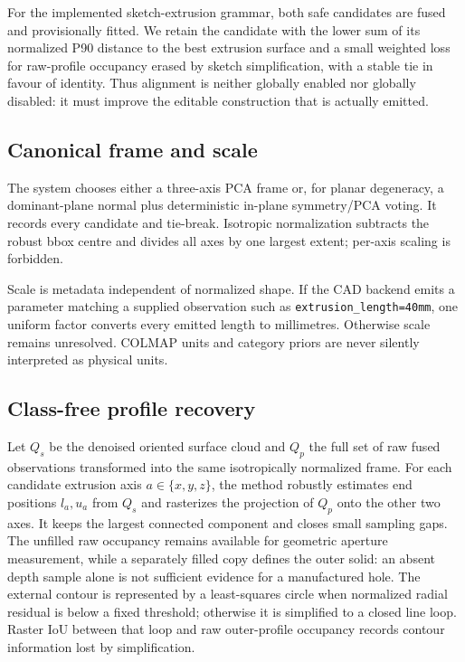 \documentclass[10pt]{article}
\begin{document}
For the implemented sketch-extrusion grammar, both safe candidates are fused
and provisionally fitted.  We retain the candidate with the lower sum of its
normalized P90 distance to the best extrusion surface and a small weighted loss
for raw-profile occupancy erased by sketch simplification, with a stable tie in
favour of identity.  Thus alignment is neither globally enabled nor
globally disabled: it must improve the editable construction that is actually
emitted.

\subsection{Canonical frame and scale}

The system chooses either a three-axis PCA frame or, for planar degeneracy, a
dominant-plane normal plus deterministic in-plane symmetry/PCA voting.  It
records every candidate and tie-break.  Isotropic normalization subtracts the
robust bbox centre and divides all axes by one largest extent; per-axis scaling
is forbidden.

Scale is metadata independent of normalized shape.  If the CAD backend emits a
parameter matching a supplied observation such as
\texttt{extrusion\_length=40mm}, one uniform factor converts every emitted length to
millimetres.  Otherwise scale remains unresolved.  COLMAP units and category
priors are never silently interpreted as physical units.

\subsection{Class-free profile recovery}

Let $Q_s$ be the denoised oriented surface cloud and $Q_p$ the full set of raw
fused observations transformed into the same isotropically normalized frame.
For each candidate extrusion axis $a\in\{x,y,z\}$, the method robustly estimates
end positions $l_a,u_a$ from $Q_s$ and rasterizes the projection of $Q_p$ onto the other two
axes.  It keeps the largest connected component and closes small sampling gaps.
The unfilled raw occupancy remains available for geometric aperture measurement,
while a separately filled copy defines the outer solid: an absent depth sample
alone is not sufficient evidence for a manufactured hole.  The external contour is represented by a
least-squares circle when normalized radial residual is below a fixed threshold;
otherwise it is simplified to a closed line loop.  Raster IoU between that loop
and raw outer-profile occupancy records contour information lost by simplification.
\end{document}
